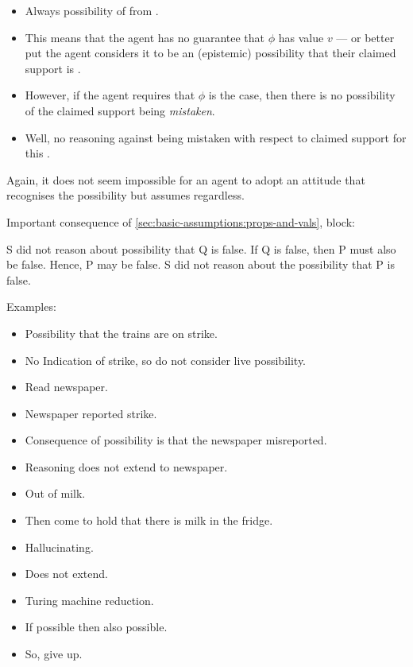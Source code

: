 \begin{note}
  \color{red}
    \begin{itemize}
    \item Always possibility of \mom{} from \nfcs{}.
    \item This means that the agent has no guarantee that \(\phi\) has value \(v\) --- or better put the agent considers it to be an (epistemic) possibility that their claimed support is \mom{}.
    \item However, if the agent requires that \(\phi\) is the case, then there is no possibility of the claimed support being \emph{mistaken}.
    \item Well, no reasoning against being mistaken with respect to claimed support for this \requ{}.
  \end{itemize}

  Again, it does not seem impossible for an agent to adopt an attitude that recognises the possibility but assumes regardless.
\end{note}

\begin{note}
  Important consequence of \autoref{sec:basic-assumptions:props-and-vals}, block:

  S did not reason about possibility that Q is false.
  If Q is false, then P must also be false.
  Hence, P may be false.
  S did not reason about the possibility that P is false.

  \begin{note}
  Examples:
  \begin{itemize}
  \item Possibility that the trains are on strike.
  \item No Indication of strike, so do not consider live possibility.
  \item Read newspaper.
  \item Newspaper reported strike.
  \item Consequence of possibility is that the newspaper misreported.
  \item Reasoning does not extend to newspaper.
  \end{itemize}

  \begin{itemize}
  \item Out of milk.
  \item Then come to hold that there is milk in the fridge.
  \item Hallucinating.
  \item Does not extend.
  \end{itemize}

  \begin{itemize}
  \item Turing machine reduction.
  \item If possible then also possible.
  \item So, give up.
  \end{itemize}
\end{note}
\end{note}


